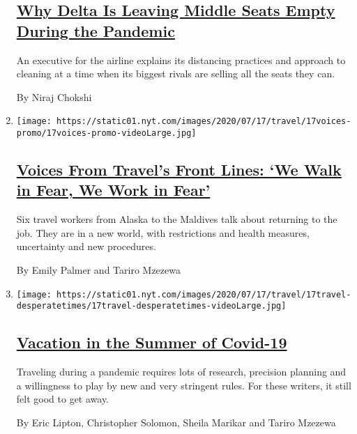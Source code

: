 \begin{enumerate}
  \hypertarget{why-delta-is-leaving-middle-seats-empty-during-the-pandemic}{%
  \subsection{\texorpdfstring{\href{/2020/07/27/business/delta-airlines-bill-lentsch.html}{Why
  Delta Is Leaving Middle Seats Empty During the
  Pandemic}}{Why Delta Is Leaving Middle Seats Empty During the Pandemic}}\label{why-delta-is-leaving-middle-seats-empty-during-the-pandemic}}

  An executive for the airline explains its distancing practices and
  approach to cleaning at a time when its biggest rivals are selling all
  the seats they can.

  By Niraj Chokshi
\item
  \texttt{[image: https://static01.nyt.com/images/2020/07/17/travel/17voices-promo/17voices-promo-videoLarge.jpg]}

  \hypertarget{voices-from-travels-front-lines-we-walk-in-fear-we-work-in-fear}{%
  \subsection{\texorpdfstring{\href{/2020/07/17/travel/coronavirus-travel-hospitality-workers.html}{Voices
  From Travel's Front Lines: `We Walk in Fear, We Work in
  Fear'}}{Voices From Travel's Front Lines: `We Walk in Fear, We Work in Fear'}}\label{voices-from-travels-front-lines-we-walk-in-fear-we-work-in-fear}}

  Six travel workers from Alaska to the Maldives talk about returning to
  the job. They are in a new world, with restrictions and health
  measures, uncertainty and new procedures.

  By Emily Palmer and Tariro Mzezewa
\item
  \texttt{[image: https://static01.nyt.com/images/2020/07/17/travel/17travel-desperatetimes/17travel-desperatetimes-videoLarge.jpg]}

  \hypertarget{vacation-in-the-summer-of-covid-19}{%
  \subsection{\texorpdfstring{\href{/2020/07/16/travel/virus-vacation.html}{Vacation
  in the Summer of
  Covid-19}}{Vacation in the Summer of Covid-19}}\label{vacation-in-the-summer-of-covid-19}}

  Traveling during a pandemic requires lots of research, precision
  planning and a willingness to play by new and very stringent rules.
  For these writers, it still felt good to get away.

  By Eric Lipton, Christopher Solomon, Sheila Marikar and Tariro Mzezewa
\end{enumerate}

